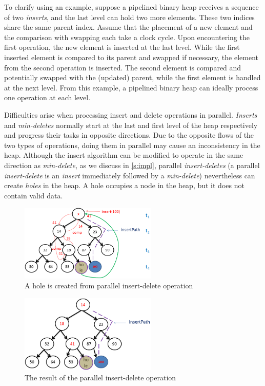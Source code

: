 To clarify using an example, suppose a pipelined binary heap receives a sequence of two {\it inserts}, and the last level can hold two more elements.
These two indices share the same parent index.
Assume that the placement of a new element and the comparison with swapping each take a clock cycle.
Upon encountering the first operation, the new element is inserted at the last level.
While the first inserted element is compared to its parent and swapped if necessary, the element from the second operation is inserted.
The second element is compared and potentially swapped with the (updated) parent, while the first element is handled at the next level.
From this example, a pipelined binary heap can ideally process one operation at each level.

Difficulties arise when processing insert and delete operations in parallel.
{\it Inserts} and {\it min-deletes} normally start at the last and first level of the heap respectively and progress their tasks in opposite directions.
Due to the opposite flows of the two types of operations, doing them in parallel may cause an inconsistency in the heap.
Although the insert algorithm can be modified to operate in the same direction as {\it min-delete}, as we discuss in \autoref{s:impl}, parallel {\it insert-deletes} (a parallel {\it insert-delete} is an {\it insert} immediately followed by a {\it min-delete}) nevertheless can create {\it holes} in the heap. 
A hole occupies a node in the heap, but it does not contain valid data.

\begin{figure}[!ht]
  \centering
  \includegraphics[width=6.5cm]{fig/normal-insert-delete.png}
      \caption{A hole is created from parallel insert-delete operation}
    \label{hole}
\end{figure}

\begin{figure}[!ht]
  \centering
  \includegraphics[width=6.5cm]{fig/normal-insert-delete-2.png}
      \caption{The result of the parallel insert-delete operation}
    \label{hole-after}
\end{figure}

